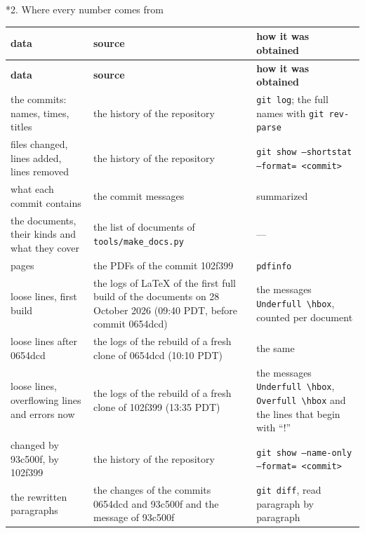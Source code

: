 \documentclass[10pt,a4paper]{article}
\makeatletter
\renewcommand\section{\@startsection{section}{1}{\z@}{-3.5ex \@plus -1ex \@minus -.2ex}{2.3ex \@plus.2ex}{\normalfont\Large\bfseries\raggedright}}
\makeatother
\begin{document}
\section*{2. Where every number comes from}
{\footnotesize
\begin{longtable}{>{\raggedright\arraybackslash}p{}>{\raggedright\arraybackslash}p{}>{\raggedright\arraybackslash}p{}}
\toprule
\textbf{data} & \textbf{source} & \textbf{how it was obtained} \\
\midrule\endfirsthead
\toprule
\textbf{data} & \textbf{source} & \textbf{how it was obtained} \\
\midrule\endhead
\endfoot
\bottomrule\endlastfoot
the commits: names, times, titles & the history of the repository & \texttt{git log}; the full names with \texttt{git rev-parse} \\
files changed, lines added, lines removed & the history of the repository & \texttt{git show --shortstat --format= <commit>} \\
what each commit contains & the commit messages & summarized \\
the documents, their kinds and what they cover & the list of documents of \texttt{tools/\allowbreak{}make\_\allowbreak{}docs.py} & — \\
pages & the PDFs of the commit 102f399 & \texttt{pdfinfo} \\
loose lines, first build & the logs of LaTeX of the first full build of the documents on 28 October 2026 (09:40 PDT, before commit 0654dcd) & the messages \texttt{Underfull \textbackslash{}\allowbreak{}hbox}, counted per document \\
loose lines after 0654dcd & the logs of the rebuild of a fresh clone of 0654dcd (10:10 PDT) & the same \\
loose lines, overflowing lines and errors now & the logs of the rebuild of a fresh clone of 102f399 (13:35 PDT) & the messages \texttt{Underfull \textbackslash{}\allowbreak{}hbox}, \texttt{Overfull \textbackslash{}\allowbreak{}hbox} and the lines that begin with “!” \\
changed by 93c500f, by 102f399 & the history of the repository & \texttt{git show --name-only --format= <commit>} \\
the rewritten paragraphs & the changes of the commits 0654dcd and 93c500f and the message of 93c500f & \texttt{git diff}, read paragraph by paragraph \\

\end{longtable}}
\end{document}
